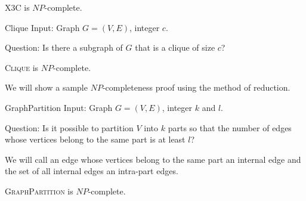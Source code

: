 \begin{thm}
\textsc{X3C} is $NP$-complete.
\end{thm}


\begin{problem}{Clique}
    Input: Graph $G = (V, E)$, integer $c$.

    Question: Is there a subgraph of $G$ that is a clique of size $c$?
\end{problem}

\begin{thm}
\textsc{Clique} is $NP$-complete.
\end{thm}


We will show a sample $NP$-completeness proof using the method of reduction.

\begin{problem}{GraphPartition}
Input: Graph $G = (V, E)$, integer $k$ and $l$.

Question: Is it possible to partition $V$ into $k$ parts so that the number of edges
whose vertices belong to the same part is at least $l$?
\end{problem}

We will call an edge whose vertices belong to the same part an internal edge
and the set of all internal edges an intra-part edges.

\begin{thm} \label{gp-np}
\textsc{GraphPartition} is $NP$-complete.
\end{thm}

